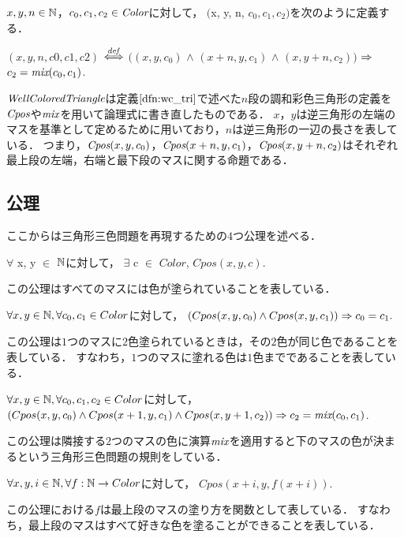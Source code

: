 \begin{dfn}[$\WCT$]
  $x, y, n \in \mathbb{N}$，$c_0, c_1, c_2 \in \textit{Color}$に対して，
  \WCT$($x, y, n, $c_0, c_1, c_2)$を次のように定義する．
  
  \WCT$(x, y, n, c0, c1, c2)$ $\overset{{\it def}}{\Longleftrightarrow}$
  $($\Cpos $(x,y,c_0)$ $\land$ \Cpos$(x+n,y,c_1)$ $\land$ \Cpos$(x,y+n,c_2))$ $\Rightarrow$ $c_2 = \textit{mix}(c_0,c_1)$.
  
  $\WCT$は定義$\ref{dfn:wc_tri}$で述べた$n$段の調和彩色三角形の定義を$\textit{Cpos}$や$\textit{mix}$を用いて論理式に書き直したものである．
  $x$，$y$は逆三角形の左端のマスを基準として定めるために用いており，$n$は逆三角形の一辺の長さを表している．
  つまり，$\textit{Cpos} (x,y,c_0)$，$\textit{Cpos} (x+n,y,c_1)$，$\textit{Cpos} (x,y+n,c_2)$はそれぞれ最上段の左端，右端と最下段のマスに関する命題である．
\end{dfn}

\subsection{公理}
ここからは三角形三色問題を再現するための$4$つ公理を述べる．
\begin{axm}[$\Cexists$] \label{axm:exists}
  $\forall$ x, y $\in$ $\mathbb{N}$に対して，
  $\exists$ c $\in$ $Color$, $Cpos(x,y,c)$.
  
  この公理はすべてのマスには色が塗られていることを表している．
\end{axm}
\begin{axm}[$\Cuniq$] \label{axm:uniq}
  $\forall x, y \in \mathbb{N}, \forall c_0, c_1 \in Color$に対して，
  $(Cpos(x,y,c_0) \land Cpos(x,y,c_1)) \Rightarrow c_0 = c_1.$
  
  この公理は$1$つのマスに$2$色塗られているときは，その$2$色が同じ色であることを表している．
  すなわち，$1$つのマスに塗れる色は$1$色までであることを表している．
\end{axm}
\begin{axm}[$\Cmix$] \label{axm:mix}
  $\forall x, y \in \mathbb{N}, \forall c_0, c_1, c_2 \in Color$に対して，
  $(Cpos(x,y,c_0) \land Cpos(x+1,y,c_1) \land Cpos(x,y+1,c_2)) \Rightarrow c_2 = \textit{mix}(c_0,c_1)$.
  
  この公理は隣接する$2$つのマスの色に演算$\textit{mix}$を適用すると下のマスの色が決まるという三角形三色問題の規則をしている．
\end{axm}
\begin{axm}[$C\_paint$] \label{axm:paint}
  $\forall x, y, i \in \mathbb{N}, \forall f:\mathbb{N} \to Color$に対して，
  $Cpos(x+i,y,f(x+i))$.
  
  この公理における$f$は最上段のマスの塗り方を関数として表している．
  すなわち，最上段のマスはすべて好きな色を塗ることができることを表している．
\end{axm}

